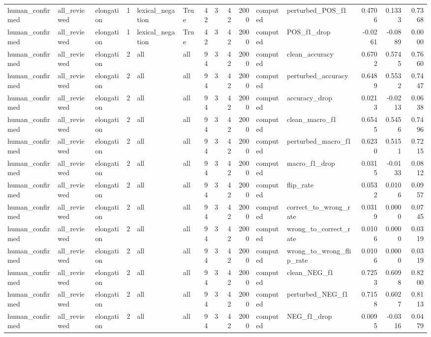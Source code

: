 \begin{tabular}{lllrllrrrrllrrr}
human_confirmed & all_reviewed & elongation & 1 & lexical_negation & True & 42 & 3 & 42 & 2000 & computed & perturbed_POS_f1 & 0.4706 & 0.1333 & 0.7368 \\
human_confirmed & all_reviewed & elongation & 1 & lexical_negation & True & 42 & 3 & 42 & 2000 & computed & POS_f1_drop & -0.0261 & -0.0889 & 0.0000 \\
human_confirmed & all_reviewed & elongation & 2 & all & all & 94 & 3 & 42 & 2000 & computed & clean_accuracy & 0.6702 & 0.5745 & 0.7660 \\
human_confirmed & all_reviewed & elongation & 2 & all & all & 94 & 3 & 42 & 2000 & computed & perturbed_accuracy & 0.6489 & 0.5532 & 0.7447 \\
human_confirmed & all_reviewed & elongation & 2 & all & all & 94 & 3 & 42 & 2000 & computed & accuracy_drop & 0.0213 & -0.0213 & 0.0638 \\
human_confirmed & all_reviewed & elongation & 2 & all & all & 94 & 3 & 42 & 2000 & computed & clean_macro_f1 & 0.6545 & 0.5456 & 0.7496 \\
human_confirmed & all_reviewed & elongation & 2 & all & all & 94 & 3 & 42 & 2000 & computed & perturbed_macro_f1 & 0.6230 & 0.5151 & 0.7215 \\
human_confirmed & all_reviewed & elongation & 2 & all & all & 94 & 3 & 42 & 2000 & computed & macro_f1_drop & 0.0315 & -0.0133 & 0.0812 \\
human_confirmed & all_reviewed & elongation & 2 & all & all & 94 & 3 & 42 & 2000 & computed & flip_rate & 0.0532 & 0.0106 & 0.0957 \\
human_confirmed & all_reviewed & elongation & 2 & all & all & 94 & 3 & 42 & 2000 & computed & correct_to_wrong_rate & 0.0319 & 0.0000 & 0.0745 \\
human_confirmed & all_reviewed & elongation & 2 & all & all & 94 & 3 & 42 & 2000 & computed & wrong_to_correct_rate & 0.0106 & 0.0000 & 0.0319 \\
human_confirmed & all_reviewed & elongation & 2 & all & all & 94 & 3 & 42 & 2000 & computed & wrong_to_wrong_flip_rate & 0.0106 & 0.0000 & 0.0319 \\
human_confirmed & all_reviewed & elongation & 2 & all & all & 94 & 3 & 42 & 2000 & computed & clean_NEG_f1 & 0.7253 & 0.6098 & 0.8200 \\
human_confirmed & all_reviewed & elongation & 2 & all & all & 94 & 3 & 42 & 2000 & computed & perturbed_NEG_f1 & 0.7158 & 0.6027 & 0.8113 \\
human_confirmed & all_reviewed & elongation & 2 & all & all & 94 & 3 & 42 & 2000 & computed & NEG_f1_drop & 0.0095 & -0.0316 & 0.0479 \\

\end{tabular}

